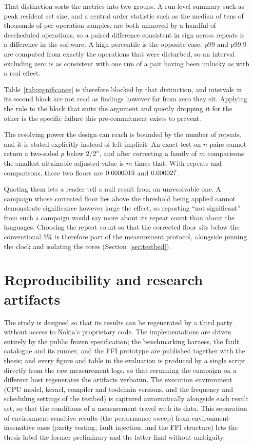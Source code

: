 \documentclass[english,twoside,openright,a4paper,censored,csm,software-track-2020]{HYthesisML}
\begin{document}
That distinction sorts the metrics into two groups. A run-level summary such as peak resident set
size, and a central order statistic such as the median of tens of thousands of per-operation
samples, are both unmoved by a handful of descheduled operations, so a paired difference
consistent in sign across repeats is a difference in the software. A high percentile is the
opposite case: p99 and p99.9 are computed from exactly the operations that were disturbed, so an
interval excluding zero is as consistent with one run of a pair having been unlucky as with a real
effect.

Table~\ref{tab:significance} is therefore blocked by that distinction, and intervals in its second
block are not read as findings however far from zero they sit. Applying the rule to the block that
suits the argument and quietly dropping it for the other is the specific failure this
pre-commitment exists to prevent.

The resolving power the design can reach is bounded by the number of repeats, and it is stated
explicitly instead of left implicit. An exact test on $n$ pairs cannot return a two-sided $p$
below $2/2^{n}$, and after correcting a family of $m$ comparisons the smallest attainable adjusted
value is $m$ times that. With \NRepeats{} repeats and \NTests{} comparisons, those two floors are
$0.0000019$ and $0.000027$.

Quoting them lets a reader tell a null result from an unresolvable one. A campaign whose corrected
floor lies above the threshold being applied cannot demonstrate significance however large the
effect, so reporting ``not significant'' from such a campaign would say more about its repeat
count than about the languages. Choosing the repeat count so that the corrected floor sits below
the conventional $5\%$ is therefore part of the measurement protocol, alongside pinning the clock
and isolating the cores (Section~\ref{sec:testbed}).

\section{Reproducibility and research artifacts}
The study is designed so that its results can be regenerated by a third party without access to
Nokia's proprietary code. The implementations are driven entirely by the public frozen
specification; the benchmarking harness, the fault catalogue and its runner, and the FFI
prototype are published together with the thesis; and every figure and table in the evaluation
is produced by a single script directly from the raw measurement logs, so that rerunning the
campaign on a different host regenerates the artifacts verbatim. The execution environment (CPU
model, kernel, compiler and toolchain versions, and the frequency and scheduling settings of
the testbed) is captured automatically alongside each result set, so that the conditions of a
measurement travel with its data. This separation of environment-sensitive results (the
performance sweep) from environment-insensitive ones (parity testing, fault injection, and the
FFI structure) lets the thesis label the former preliminary and the latter final
without ambiguity.
\end{document}
